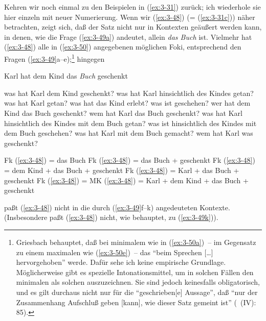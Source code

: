 \documentclass[output=paper]{langsci/langscibook}
\begin{document}
Kehren wir noch einmal zu den Beispielen in (\ref{ex:3-31}) zurück; ich wiederhole sie hier einzeln mit neuer Numerierung. Wenn wir (\ref{ex:3-48}) (= (\ref{ex:3-31c})) näher betrachten, zeigt sich,  daß der Satz nicht nur in Kontexten geäußert
werden kann, in denen, wie die Frage (\ref{ex:3-49a}) andeutet, allein \textit{das Buch}
 ist. Vielmehr hat (\ref{ex:3-48}) alle in (\ref{ex:3-50}) angegebenen möglichen Foki,
entsprechend den Fragen (\ref{ex:3-49}a--e);\footnote{\label{fn:3-14}%
  Griesbach behauptet, daß bei minimalem  wie in (\ref{ex:3-50a})~-- im
  Gegensatz zu einem maximalen  wie (\ref{ex:3-50e})~-- das 
  "`beim Sprechen [\ldots] hervorgehoben"' werde. Dafür sehe ich keine
  empirische Grundlage. Möglicherweise gibt es spezielle
  Intonationsmittel, um in solchen Fällen den minimalen  als
  solchen auszuzeichnen. Sie sind jedoch keinesfalls obligatorisch, und
  es gilt durchaus nicht nur für die "`geschrieben[e] Aussage"', daß "`nur
  der Zusammenhang Aufschluß geben [kann], wie dieser Satz gemeint ist"'
  (\citealt{Griesbach1961a}~(IV): 85).%
}
hingegen
\begin{exe}
\ex
\label{ex:3-48}
Karl hat dem Kind das \textit{Buch} geschenkt
\ex
\label{ex:3-49}
\begin{xlist}
\ex
\label{ex:3-49a}
was hat Karl dem Kind geschenkt?
\ex
\label{ex:3-49b}
was hat Karl hinsichtlich des Kindes getan?
\ex
\label{ex:3-49c}
was hat Karl getan?
\ex
\label{ex:3-49d}
was hat das Kind erlebt?
\ex
\label{ex:3-49e}
was ist geschehen?
\ex
\label{ex:3-49f}
wer hat dem Kind das Buch geschenkt?
\ex
\label{ex:3-49g}
wem hat Karl das Buch geschenkt?
\ex
\label{ex:3-49h}
was hat Karl hinsichtlich des Kindes mit dem Buch getan?
\ex
\label{ex:3-49i}
was ist hinsichtlich des Kindes mit dem Buch geschehen?
\ex
\label{ex:3-49j}
was hat Karl mit dem Buch gemacht?
\ex
\label{ex:3-49k}
wem hat Karl was geschenkt?
\end{xlist}
\ex
\label{ex:3-50}
\begin{xlist}
\ex
\label{ex:3-50a}
Fk (\ref{ex:3-48}) = das Buch
\ex
\label{ex:3-50b}
Fk (\ref{ex:3-48}) = das Buch + geschenkt
\ex
\label{ex:3-50c}
Fk (\ref{ex:3-48}) = dem Kind + das Buch + geschenkt
\ex
\label{ex:3-50d}
Fk (\ref{ex:3-48}) = Karl + das Buch + geschenkt
\ex
\label{ex:3-50e}
Fk (\ref{ex:3-48}) = MK (\ref{ex:3-48}) = Karl + dem Kind + das Buch + geschenkt
\end{xlist}
\end{exe}
paßt (\ref{ex:3-48}) nicht in die durch (\ref{ex:3-49}f--k) angedeuteten
Kontexte. (Insbesondere paßt (\ref{ex:3-48}) nicht, wie \citet[523]{Bartsch76}
behauptet, zu (\ref{ex:3-49k})).
\end{document}
